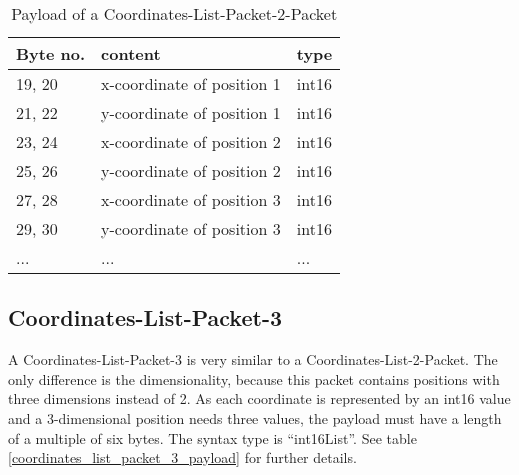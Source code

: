 \begin{table}[htdp]
  \begin{center}
    \begin{tabular}{l|l|l}
      \textbf{Byte no.} & \textbf{content} & \textbf{type} \\
      \hline
      \hline
      19, 20 & x-coordinate of position 1 & int16 \\
      \hline
      21, 22 & y-coordinate of position 1 & int16 \\
      \hline
      23, 24 & x-coordinate of position 2 & int16 \\
      \hline
      25, 26 & y-coordinate of position 2 & int16 \\
      \hline
      27, 28 & x-coordinate of position 3 & int16 \\
      \hline
      29, 30 & y-coordinate of position 3 & int16 \\
      \hline
      ... & ... & ... \\
    \end{tabular}
    \caption{Payload of a Coordinates-List-Packet-2-Packet}
    \label{coordinates_list_packet_2_payload}
  \end{center}
\end{table}


\subsection{Coordinates-List-Packet-3}
\label{subsection:coordinates-list-packet-3}

A Coordinates-List-Packet-3 is very similar to a Coordinates-List-2-Packet. The only difference is the dimensionality, because
this packet contains positions with three dimensions instead of 2. As each coordinate is represented by an int16 value and
a 3-dimensional position needs three values, the payload must have a length of a multiple of six bytes. The syntax type is
``int16List''. See table \ref{coordinates_list_packet_3_payload} for further details.

